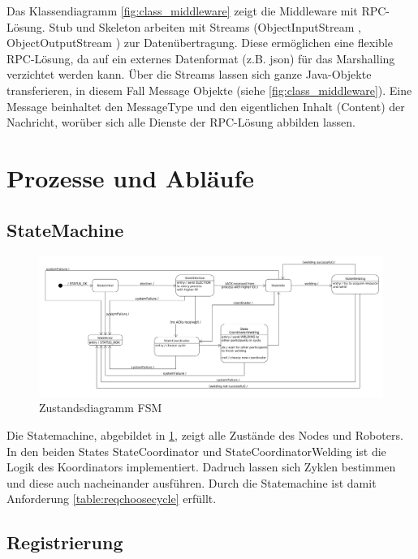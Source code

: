 Das Klassendiagramm \ref{fig:class_middleware} zeigt die Middleware mit RPC-Lösung. Stub und Skeleton arbeiten
mit Streams (ObjectInputStream \citep{objectinputstream}, ObjectOutputStream \citep{objectoutputstream})
zur Datenübertragung. Diese ermöglichen eine flexible RPC-Lösung, da auf ein externes 
Datenformat (z.B. json) für das Marshalling \citep{tanenbaumvansteen} verzichtet werden kann. Über die Streams lassen 
sich ganze Java-Objekte transferieren, in diesem Fall \glqq Message\grqq{} Objekte (siehe
\ref{fig:class_middleware}). Eine Message beinhaltet den MessageType und den eigentlichen Inhalt (Content) 
der Nachricht, worüber sich alle Dienste der RPC-Lösung abbilden lassen.

\clearpage

\section{Prozesse und Abläufe}

\subsection{StateMachine}

\begin{figure}[h]
 \includegraphics[width=\textwidth]{../diagrams/7_fsm.png}
 \caption{Zustandsdiagramm FSM}
 \label{fig:fsm}
\end{figure}

Die Statemachine, abgebildet in \ref{fig:fsm}, zeigt alle Zustände des Nodes und Roboters.
In den beiden States \glqq StateCoordinator\grqq{} und \glqq StateCoordinatorWelding\grqq{} ist die Logik
des Koordinators implementiert. Dadruch lassen sich Zyklen bestimmen und diese auch nacheinander ausführen.
Durch die Statemachine ist damit Anforderung \ref{table:reqchoosecycle} erfüllt.

\clearpage

\subsection{Registrierung}

